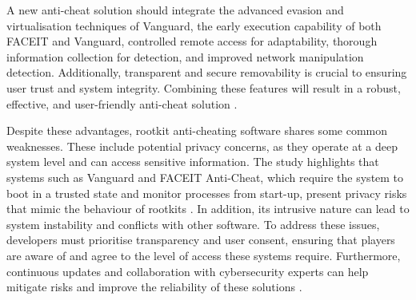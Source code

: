 \documentclass[a4paper, 12pt]{article}
\begin{document}
\begin{table}[H]
    \centering
    \caption{Overview of the analysed anti-cheat systems, including a comparison with the Flame rootkit.}
    \label{tab:anti_cheat_comparison}
\end{table}

A new anti-cheat solution should integrate the advanced evasion and virtualisation techniques of Vanguard, the early execution capability of both FACEIT and Vanguard, controlled remote access for adaptability, thorough information collection for detection, and improved network manipulation detection. Additionally, transparent and secure removability is crucial to ensuring user trust and system integrity. Combining these features will result in a robust, effective, and user-friendly anti-cheat solution \cite{dorner_2024_if}.

Despite these advantages, rootkit anti-cheating software shares some common weaknesses. These include potential privacy concerns, as they operate at a deep system level and can access sensitive information. The study highlights that systems such as Vanguard and FACEIT Anti-Cheat, which require the system to boot in a trusted state and monitor processes from start-up, present privacy risks that mimic the behaviour of rootkits \cite{dorner_2024_if}. In addition, its intrusive nature can lead to system instability and conflicts with other software. To address these issues, developers must prioritise transparency and user consent, ensuring that players are aware of and agree to the level of access these systems require. Furthermore, continuous updates and collaboration with cybersecurity experts can help mitigate risks and improve the reliability of these solutions \cite{dorner_2024_if}.
\end{document}
